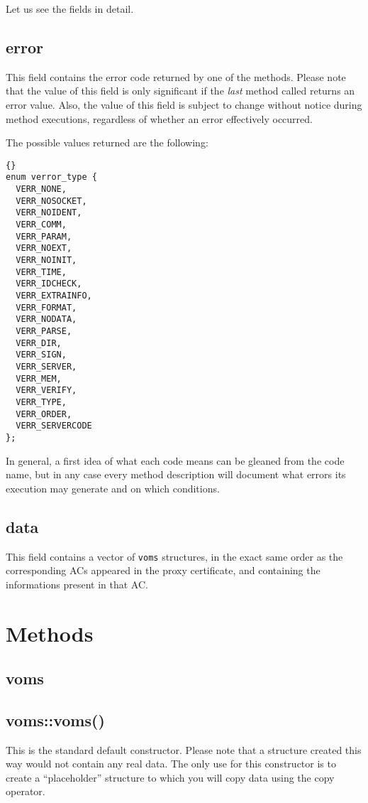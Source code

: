 \documentclass[a4paper]{book}
\begin{document}
Let us see the fields in detail.

\subsection{error}
This field contains the error code returned by one of the methods.
Please note that the value of this field is only significant if the
\emph{last} method called returns an error value.  Also, the value of
this field is subject to change without notice during method
executions, regardless of whether an error effectively occurred.

The possible values returned are the following:\bigskip\bigskip

\begin{lstlisting}{}
enum verror_type { 
  VERR_NONE,
  VERR_NOSOCKET,  
  VERR_NOIDENT,   
  VERR_COMM,      
  VERR_PARAM,     
  VERR_NOEXT,     
  VERR_NOINIT,    
  VERR_TIME,      
  VERR_IDCHECK,   
  VERR_EXTRAINFO, 
  VERR_FORMAT,    
  VERR_NODATA,    
  VERR_PARSE,     
  VERR_DIR,       
  VERR_SIGN,      
  VERR_SERVER,    
  VERR_MEM,       
  VERR_VERIFY,    
  VERR_TYPE,      
  VERR_ORDER,     
  VERR_SERVERCODE 
};
\end{lstlisting}

In general, a first idea of what each code means can be gleaned from
the code name, but in any case every method description will document
what errors its execution may generate and on which conditions.

\subsection{data}
This field contains a vector of \texttt{voms} structures, in the exact
same order as the corresponding ACs appeared in the proxy certificate,
and containing the informations present in that AC.

\section{Methods}
\subsection {voms}
\subsection{voms::voms()}
This is the standard default constructor.  Please note that a structure
created this way would not contain any real data.  The only use for this
constructor is to create a ``placeholder'' structure to which you
will copy data using the copy operator.
\end{document}
